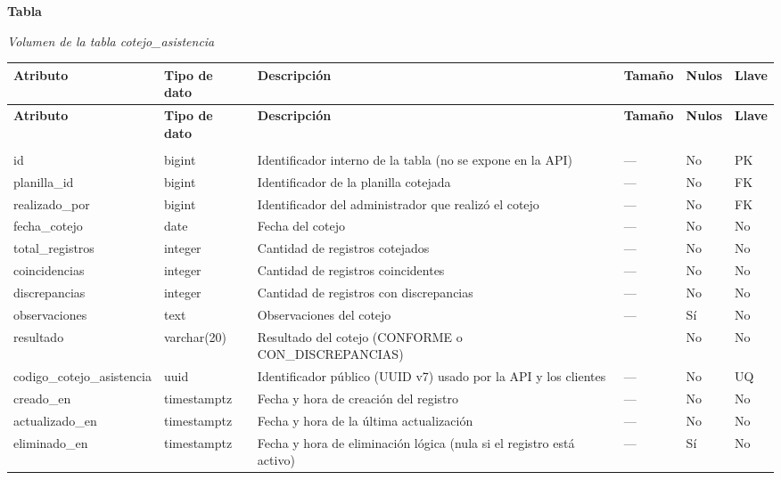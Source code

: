 \label{tab:volumen_cotejo_asistencia}
\noindent\textbf{Tabla~\thetable}\par\nopagebreak
\noindent\textit{Volumen de la tabla cotejo\_\allowbreak{}asistencia}\par\nopagebreak
\begingroup\small\linespread{1}\selectfont\setlength{\tabcolsep}{4pt}
\begin{longtable}{>{\raggedright\arraybackslash}p{3.4cm} >{\raggedright\arraybackslash}p{2.5cm} >{\raggedright\arraybackslash}p{4.8cm} >{\centering\arraybackslash}p{1.6cm}>{\centering\arraybackslash}p{1.1cm} >{\centering\arraybackslash}p{1.3cm}}
\toprule
\textbf{Atributo} & \textbf{Tipo de dato} & \textbf{Descripción} & \textbf{Tamaño} & \textbf{Nulos} & \textbf{Llave} \\
\midrule
\endfirsthead
\toprule
\textbf{Atributo} & \textbf{Tipo de dato} & \textbf{Descripción} & \textbf{Tamaño} & \textbf{Nulos} & \textbf{Llave} \\
\midrule
\endhead
\endfoot
\bottomrule
\multicolumn{6}{l}{\textit{Nota.} Elaboración propia.} \\
\endlastfoot
id & bigint & Identificador interno de la tabla (no se expone en la API) & — & No & PK \\
planilla\_\allowbreak{}id & bigint & Identificador de la planilla cotejada & — & No & FK \\
realizado\_\allowbreak{}por & bigint & Identificador del administrador que realizó el cotejo & — & No & FK \\
fecha\_\allowbreak{}cotejo & date & Fecha del cotejo & — & No & No \\
total\_\allowbreak{}registros & integer & Cantidad de registros cotejados & — & No & No \\
coincidencias & integer & Cantidad de registros coincidentes & — & No & No \\
discrepancias & integer & Cantidad de registros con discrepancias & — & No & No \\
observaciones & text & Observaciones del cotejo & — & Sí & No \\
resultado & varchar(20) & Resultado del cotejo (CONFORME o CON\_\allowbreak{}DISCREPANCIAS) & 20 & No & No \\
codigo\_\allowbreak{}cotejo\_\allowbreak{}asistencia & uuid & Identificador público (UUID v7) usado por la API y los clientes & — & No & UQ \\
creado\_\allowbreak{}en & timestamptz & Fecha y hora de creación del registro & — & No & No \\
actualizado\_\allowbreak{}en & timestamptz & Fecha y hora de la última actualización & — & No & No \\
eliminado\_\allowbreak{}en & timestamptz & Fecha y hora de eliminación lógica (nula si el registro está activo) & — & Sí & No \\
\end{longtable}
\endgroup
\addtocounter{table}{-1}

